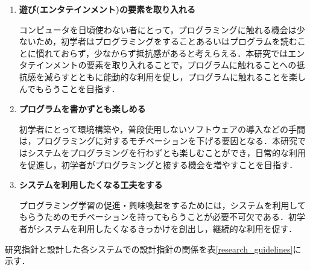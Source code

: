 \begin{enumerate}
  \item {\bf 遊び(エンタテインメント)の要素を取り入れる}

  コンピュータを日頃使わない者にとって，プログラミングに触れる機会は少ないため，初学者はプログラミングをすることあるいはプログラムを読むことに慣れておらず，少なからず抵抗感があると考えらえる．本研究ではエンタテインメントの要素を取り入れることで，プログラムに触れることへの抵抗感を減らすとともに能動的な利用を促し，プログラムに触れることを楽しんでもらうことを目指す．

  \item {\bf プログラムを書かずとも楽しめる}

  初学者にとって環境構築や，普段使用しないソフトウェアの導入などの手間は，プログラミングに対するモチベーションを下げる要因となる．本研究ではシステムをプログラミングを行わずとも楽しむことができ，日常的な利用を促進し，初学者がプログラミングと接する機会を増やすことを目指す．

  \item {\bf システムを利用したくなる工夫をする}

  プログラミング学習の促進・興味喚起をするためには，システムを利用してもらうためのモチベーションを持ってもらうことが必要不可欠である．初学者がシステムを利用したくなるきっかけを創出し，継続的な利用を促す．

\end{enumerate}

研究指針と設計した各システムでの設計指針の関係を表\ref{research_guidelines}に示す．


